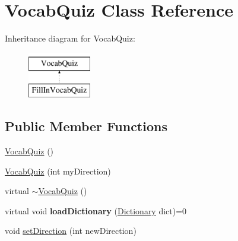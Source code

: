 \hypertarget{classVocabQuiz}{
\section{VocabQuiz Class Reference}
\label{classVocabQuiz}
}
Inheritance diagram for VocabQuiz:\begin{figure}[H]
\begin{center}
\leavevmode
\includegraphics[height=2cm]{classVocabQuiz}
\end{center}
\end{figure}
\subsection*{Public Member Functions}
\begin{DoxyCompactItemize}
\item 
\hyperlink{classVocabQuiz_aa9f188fd46b6bfd21c8e1e3d5883d350}{VocabQuiz} ()
\item 
\hyperlink{classVocabQuiz_a7c0575b4418431675956078c9b403166}{VocabQuiz} (int myDirection)
\item 
virtual \hyperlink{classVocabQuiz_a55c4c64161cc8e22643b0daa8dcf95a4}{$\sim$VocabQuiz} ()
\item 
\hypertarget{classVocabQuiz_af224c714b231d7ff4a8de770ce7280e3}{
virtual void {\bfseries loadDictionary} (\hyperlink{classDictionary}{Dictionary} dict)=0}
\label{classVocabQuiz_af224c714b231d7ff4a8de770ce7280e3}

\item 
void \hyperlink{classVocabQuiz_ac9714af01fec150cdbb9d01ab305ff61}{setDirection} (int newDirection)
\end{DoxyCompactItemize}
